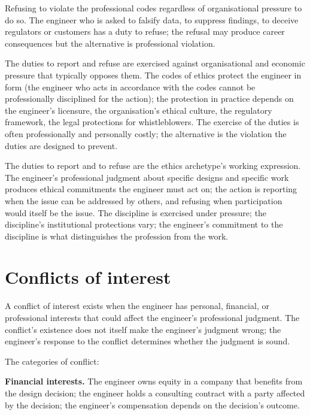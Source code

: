 Refusing to violate the professional codes regardless of organisational pressure to do so. The engineer who is asked to falsify data, to suppress findings, to deceive regulators or customers has a duty to refuse; the refusal may produce career consequences but the alternative is professional violation.

The duties to report and refuse are exercised against organisational and economic pressure that typically opposes them. The codes of ethics protect the engineer in form (the engineer who acts in accordance with the codes cannot be professionally disciplined for the action); the protection in practice depends on the engineer's licensure, the organisation's ethical culture, the regulatory framework, the legal protections for whistleblowers. The exercise of the duties is often professionally and personally costly; the alternative is the violation the duties are designed to prevent.

\begin{archetype}[ethics]
The duties to report and to refuse are the ethics archetype's working expression. The engineer's professional judgment about specific designs and specific work produces ethical commitments the engineer must act on; the action is reporting when the issue can be addressed by others, and refusing when participation would itself be the issue. The discipline is exercised under pressure; the discipline's institutional protections vary; the engineer's commitment to the discipline is what distinguishes the profession from the work.
\end{archetype}

\section{Conflicts of interest}

A conflict of interest exists when the engineer has personal, financial, or professional interests that could affect the engineer's professional judgment. The conflict's existence does not itself make the engineer's judgment wrong; the engineer's response to the conflict determines whether the judgment is sound.

The categories of conflict:

\textbf{Financial interests.} The engineer owns equity in a company that benefits from the design decision; the engineer holds a consulting contract with a party affected by the decision; the engineer's compensation depends on the decision's outcome.

